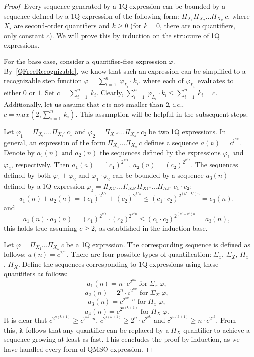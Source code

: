 \documentclass[12pt]{article}
\theoremstyle{definition}
\begin{document}
\begin{proof}
    Every sequence generated by a 1Q expression can be bounded by a sequence defined by a 1Q expression of the following form: $\Pi_{X_1}\Pi_{X_2}\ldots \Pi_{X_k} \ c$, where $X_i$ are second-order quantifiers and $k \geq 0$ (for $k = 0$, there are no quantifiers, only constant $c$). We will prove this by induction on the structure of 1Q expressions.

    For the base case, consider a quantifier-free expression $\varphi$. By~\cref{QFreeRecognizable}, we know that such an expression can be simplified to a recognizable step function $\varphi = \sum_{i = 1}^{n} \ \varphi_{L_i} \cdot k_i$, where each of $\varphi_{L_i}$ evaluates to either $0$ or $1$. Set $c = \sum_{i=1}^n \ k_i$. Clearly, $\sum_{i = 1}^{n} \ \varphi_{L_i} \cdot k_i \leq  \sum_{i=1}^n \ k_i = c$. Additionally, let us assume that $c$ is not smaller than $2$, i.e., $c = max(2, \sum_{i=1}^n \ k_i)$. This assumption will be helpful in the subsequent steps.

    Let $\varphi_1 = \Pi_{X_1'}\ldots \Pi_{X_k'} \ c_1$ and $\varphi_2 = \Pi_{X_1''}\ldots \Pi_{X_k''} \ c_2$ be two 1Q expressions. In general, an expression of the form $\Pi_{X_1}\ldots \Pi_{X_k} \ c$ defines a sequence $a(n) = c^{2^{nk}}$. Denote by $a_1(n)$ and $a_2(n)$ the sequences defined by the expressions $\varphi_1$ and $\varphi_2$, respectively. Then $a_1(n) = (c_1)^{2^{k'n}}$, $a_2(n) = (c_2)^{2^{k''n}}$. The sequences defined by both $\varphi_1 + \varphi_2$ and $\varphi_1 \cdot \varphi_2$ can be bounded by a sequence $a_3(n)$ defined by a 1Q expression $\varphi_3 = \Pi_{X1'} \ldots \Pi_{Xk'} \Pi_{X1''} \ldots \Pi_{Xk''} \ c_1 \cdot c_2$:
    $$a_1(n) + a_2(n) = (c_1)^{2^{k'n}} + (c_2)^{2^{k''n}} \leq (c_1 \cdot c_2)^{2^{(k' + k'')n}} = a_3(n),$$
    and
    $$a_1(n) \cdot a_3(n) = (c_1)^{2^{k'n}} \cdot (c_2)^{2^{k''n}} \leq (c_1 \cdot c_2)^{2^{(k' + k'')n}} = a_3(n),$$
    this holds true assuming $c \geq 2$, as established in the induction base.

    Let $\varphi = \Pi_{X_1}\ldots \Pi_{X_k} \ c$ be a 1Q expression. The corresponding sequence is defined as follows: $a(n) = c^{2^{nk}}$. There are four possible types of quantification: $\Sigma_x$, $\Sigma_X$, $\Pi_x$, $\Pi_X$. Define the sequences corresponding to 1Q expressions using these quantifiers as follows:
    $$a_1(n) = n \cdot c^{2^{nk}} \text{ for } \Sigma_x \ \varphi,$$
    $$a_2(n) = 2^n \cdot c^{2^{nk}} \text{ for } \Sigma_X \ \varphi,$$
    $$a_3(n) = c^{2^{nk} \cdot n} \text{ for } \Pi_x \ \varphi,$$
    $$a_4(n) = c^{2^{n(k+1)}} \text{ for } \Pi_X \ \varphi.$$
    It is clear that $c^{2^{n(k+1)}} \geq c^{2^{nk} \cdot n}$, $c^{2^{n(k+1)}} \geq 2^n \cdot c^{2^{nk}}$ and $c^{2^{n(k+1)}} \geq n \cdot c^{2^{nk}}$. From this, it follows that any quantifier can be replaced by a $\Pi_X$ quantifier to achieve a sequence growing at least as fast. This concludes the proof by induction, as we have handled every form of QMSO expression.


\end{proof}
\end{document}
